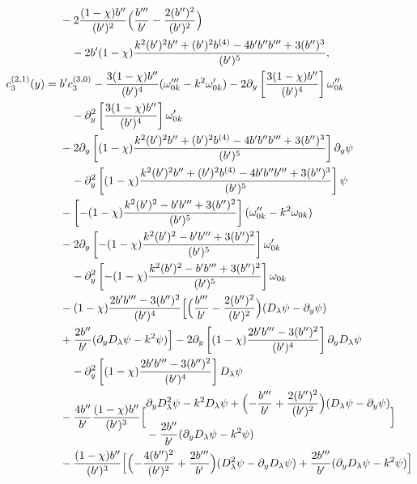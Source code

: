 \documentclass[reqno,11pt]{amsart}
\numberwithin{equation}{section}
\numberwithin{equation}{section} %
\begin{document}
\begin{enumerate}
\begin{align}
 &-2\frac{(1-\chi)b''}{(b')^2}\Bigl(\frac{b'''}{b'}-\frac{2(b'')^2}{(b')^2}\Bigr) \notag\\
 &\quad -2b'(1-\chi)\frac{k^2(b')^2b''+(b')^2b^{(4)}-4b'b''b'''+3(b'')^3}{(b')^5}, \notag\\
 c_3^{(2,1)}(y)={}&b'c_3^{(3,0)} -\frac{3(1-\chi)b''}{(b')^4}(\omega_{0k}'''-k^2\omega_{0k}') -2\partial_y\left[\frac{3(1-\chi)b''}{(b')^4}\right]\omega_{0k}'' \notag\\
 &\quad -\partial_y^2\left[\frac{3(1-\chi)b''}{(b')^4}\right]\omega_{0k}' \notag\\
 &-2\partial_y\left[(1-\chi)\frac{k^2(b')^2b''+(b')^2b^{(4)}-4b'b''b'''+3(b'')^3}{(b')^5}\right]\partial_y\psi \notag\\
 &\quad -\partial_y^2\left[(1-\chi)\frac{k^2(b')^2b''+(b')^2b^{(4)}-4b'b''b'''+3(b'')^3}{(b')^5}\right]\psi \notag\\
 &-\left[-(1-\chi)\frac{k^2(b')^2-b'b'''+3(b'')^2}{(b')^5}\right](\omega_{0k}''-k^2\omega_{0k}) \notag\\
 &-2\partial_y\left[-(1-\chi)\frac{k^2(b')^2-b'b'''+3(b'')^2}{(b')^5}\right]\omega_{0k}' \notag\\
 &\quad -\partial_y^2\left[-(1-\chi)\frac{k^2(b')^2-b'b'''+3(b'')^2}{(b')^5}\right]\omega_{0k} \notag\\
 &-(1-\chi)\frac{2b'b'''-3(b'')^2}{(b')^4}\Bigl[\Bigl(\frac{b'''}{b'}-\frac{2(b'')^2}{(b')^2}\Bigr)
                  (D_\lambda\psi-\partial_y\psi) \notag\\
 &+\frac{2b''}{b'}(\partial_yD_\lambda\psi-k^2\psi)\Bigr] -2\partial_y\left[(1-\chi)\frac{2b'b'''-3(b'')^2}{(b')^4}\right]\partial_yD_\lambda\psi \notag\\
 &\quad -\partial_y^2\left[(1-\chi)\frac{2b'b'''-3(b'')^2}{(b')^4}\right]D_\lambda\psi \notag\\
 &-\frac{4b''}{b'}\frac{(1-\chi)b''}{(b')^3}\Bigl[\begin{aligned}
       &\partial_yD_\lambda^2\psi-k^2D_\lambda\psi
       +\Bigl(-\frac{b'''}{b'}+\frac{2(b'')^2}{(b')^2}\Bigr)
                   (D_\lambda\psi-\partial_y\psi) \notag\\
       &-\frac{2b''}{b'}(\partial_yD_\lambda\psi-k^2\psi)
       \end{aligned}\Bigr] \notag\\
 &-\frac{(1-\chi)b''}{(b')^3}\Bigl[\Bigl(-\frac{4(b'')^2}{(b')^2}+\frac{2b'''}{b'}\Bigr)
                   (D_\lambda^2\psi-\partial_yD_\lambda\psi) +\frac{2b'''}{b'}(\partial_yD_\lambda\psi-k^2\psi)\Bigr] \notag\\

\end{align}
\end{enumerate}
\end{document}
